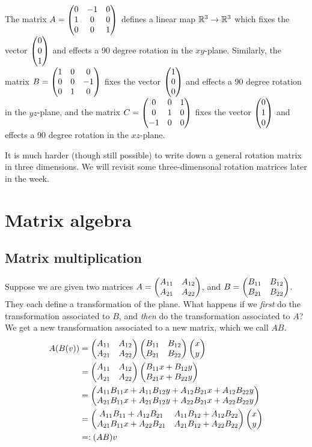 \documentclass{article}
\begin{document}
\begin{Example}\label{exm:rot3d}
The matrix \(A=\begin{pmatrix} 0 & -1 & 0 \\ 1 & 0 & 0 \\ 0 & 0 & 1\end{pmatrix}\) defines
a linear map \(\mathbb{R}^3\to\mathbb{R}^3\) which fixes the vector \(\begin{pmatrix} 0 \\ 0
\\ 1\end{pmatrix}\) and effects a 90 degree rotation in the
\(xy\)-plane. Similarly, the matrix \(B=\begin{pmatrix} 1 & 0 & 0 \\ 0 & 0 & -1
\\ 0 & 1 & 0 \end{pmatrix}\) fixes the vector \(\begin{pmatrix} 1 \\ 0 \\ 0\end{pmatrix}\) and
effects a 90 degree rotation in the \(yz\)-plane, and the matrix
\(C=\begin{pmatrix} 0 & 0 & 1 \\ 0 & 1 & 0 \\ -1 & 0 & 0\end{pmatrix}\) fixes the vector
\(\begin{pmatrix} 0 \\ 1 \\ 0\end{pmatrix}\) and effects a 90 degree rotation in the
\(xz\)-plane.


\end{Example}
It is much harder (though still possible) to write down a general
rotation matrix in three dimensions. We will revisit some
three-dimensonal rotation matrices later in the week.


\clearpage
\section{Matrix algebra}
\subsection{Matrix multiplication}
Suppose we are given two matrices \(A=\begin{pmatrix} A_{11} & A_{12} \\ A_{21} &
A_{22}\end{pmatrix}\), and \(B=\begin{pmatrix} B_{11} & B_{12} \\ B_{21} & B_{22}\end{pmatrix}\). They
each define a transformation of the plane. What happens if we {\em
first} do the transformation associated to \(B\), and {\em then} do
the transformation associated to \(A\)? We get a new transformation
associated to a new matrix, which we call \(AB\).
\begin{align*}
A(B(v))&=\begin{pmatrix} A_{11} & A_{12} \\ A_{21} & A_{22}\end{pmatrix}\begin{pmatrix} B_{11} & B_{12} \\ B_{21} & B_{22}\end{pmatrix}\begin{pmatrix} x \\ y\end{pmatrix}\\
&=\begin{pmatrix} A_{11} & A_{12} \\ A_{21} & A_{22}\end{pmatrix}\begin{pmatrix} B_{11}x+B_{12}y \\ B_{21}x+B_{22}y\end{pmatrix}\\
&=\begin{pmatrix} A_{11}B_{11}x+A_{11}B_{12}y+A_{12}B_{21}x+A_{12}B_{22}y \\ A_{21}B_{11}x+A_{21}B_{12}y+A_{22}B_{21}x+A_{22}B_{22}y\end{pmatrix}\\
&=\begin{pmatrix} A_{11}B_{11}+A_{12}B_{21} & A_{11}B_{12}+A_{12}B_{22}\\ A_{21}B_{11}x+A_{22}B_{21} & A_{21}B_{12}+A_{22}B_{22}\end{pmatrix}\begin{pmatrix} x \\ y\end{pmatrix}\\
&=:(AB)v
\end{align*}
\end{document}
